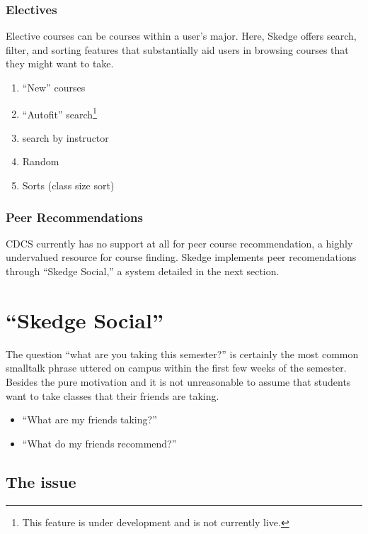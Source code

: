   \subsubsection{Electives}

  Elective courses can be courses within a user's major. Here, Skedge offers search, filter, and sorting features that substantially aid users in browsing courses that they might want to take.

  \begin{enumerate}

    \item ``New'' courses
    \item ``Autofit'' search\footnote{This feature is under development and is not currently live.}
    \item search by instructor
    \item Random
    \item Sorts (class size sort)

  \end{enumerate}

  \subsubsection{Peer Recommendations}

  CDCS currently has no support at all for peer course recommendation, a highly undervalued resource for course finding. Skedge implements peer recomendations through ``Skedge Social,'' a system detailed in the next section.


\section{``Skedge Social''}

The question ``what are you taking this semester?'' is certainly the most common smalltalk phrase uttered on campus within the first few weeks of the semester. Besides the pure motivation  and it is not unreasonable to assume that students want to take classes that their friends are taking.

\begin{itemize}
  \item ``What are my friends taking?''
  \item ``What do my friends recommend?''
\end{itemize}

\subsection{The issue}


